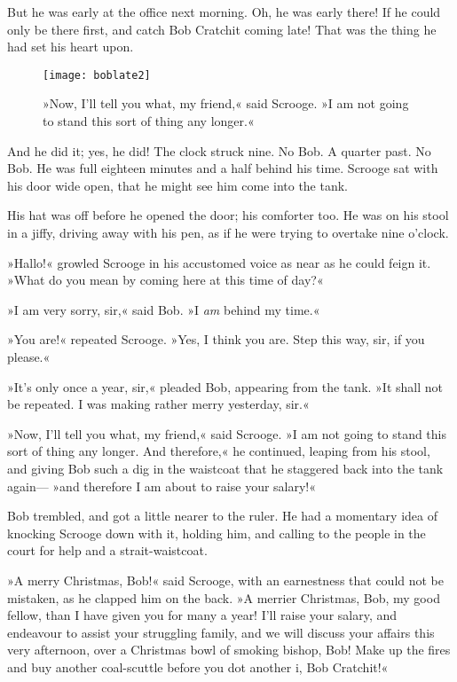 But he was early at the office next morning. Oh, he was early there! If he could only be there first, and catch Bob Cratchit coming late! That was the thing he had set his heart upon.

\begin{figure}[p]
\begin{minipage}[c]{\textwidth}
\texttt{[image: boblate2]}
\caption[\textbf{»I am not going to stand this any longer.«}]{»Now, I'll tell you what, my friend,« said Scrooge. »I am not going to stand this sort of thing any longer.«}
\end{minipage}
\end{figure}

And he did it; yes, he did! The clock struck nine. No Bob. A quarter past. No Bob. He was full eighteen minutes and a half behind his time. Scrooge sat with his door wide open, that he might see him come into the tank.

His hat was off before he opened the door; his comforter too. He was on his stool in a jiffy, driving away with his pen, as if he were trying to overtake nine o'clock.

»Hallo!« growled Scrooge in his accustomed voice as near as he could feign it. »What do you mean by coming here at this time of day?«

»I am very sorry, sir,« said Bob. »I \textit{am} behind my time.«

»You are!« repeated Scrooge. »Yes, I think you are. Step this way, sir, if you please.«

»It's only once a year, sir,« pleaded Bob, appearing from the tank. »It shall not be repeated. I was making rather merry yesterday, sir.«

»Now, I'll tell you what, my friend,« said Scrooge. »I am not going to stand this sort of thing any longer. And therefore,« he continued, leaping from his stool, and giving Bob such a dig in the waistcoat that he staggered back into the tank again— »and therefore I am about to raise your salary!«

Bob trembled, and got a little nearer to the ruler. He had a momentary idea of knocking Scrooge down with it, holding him, and calling to the people in the court for help and a strait-waistcoat.

»A merry Christmas, Bob!« said Scrooge, with an earnestness that could not be mistaken, as he clapped him on the back. »A merrier Christmas, Bob, my good fellow, than I have given you for many a year! I'll raise your salary, and endeavour to assist your struggling family, and we will discuss your affairs this very afternoon, over a Christmas bowl of smoking bishop, Bob! Make up the fires and buy another coal-scuttle before you dot another i, Bob Cratchit!«

